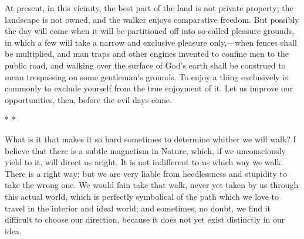 \documentclass[twoside,openright,10pt]{memoir} %
\begin{document}
At present, in this vicinity, the best part of the land is not private property; the landscape is not owned, and the walker enjoys comparative freedom. But possibly the day will come when it will be partitioned off into so-called pleasure grounds, in which a few will take a narrow and exclusive pleasure only,—when fences shall be multiplied, and man traps and other engines invented to confine men to the public road, and walking over the surface of God’s earth shall be construed to mean trespassing on some gentleman’s grounds. To enjoy a thing exclusively is commonly to exclude yourself from the true enjoyment of it. Let us improve our opportunities, then, before the evil days come.
\begin{center}\tiny * * * \normalsize \end{center}
What is it that makes it so hard sometimes to determine whither we will walk? I believe that there is a subtle magnetism in Nature, which, if we unconsciously yield to it, will direct us aright. It is not indifferent to us which way we walk. There is a right way; but we are very liable from heedlessness and stupidity to take the wrong one. We would fain take that walk, never yet taken by us through this actual world, which is perfectly symbolical of the path which we love to travel in the interior and ideal world; and sometimes, no doubt, we find it difficult to choose our direction, because it does not yet exist distinctly in our idea.
\end{document}
